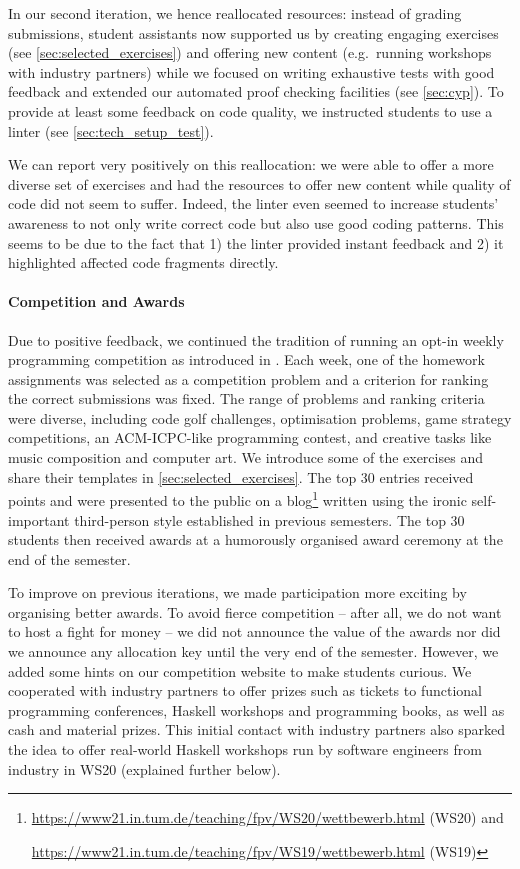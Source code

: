 In our second iteration, we hence reallocated resources:
instead of grading submissions,
student assistants now supported us by creating engaging exercises
(see \cref{sec:selected_exercises})
and offering new content (e.g.\ running workshops with industry partners)
while we focused on writing exhaustive tests with good feedback and extended our automated proof checking facilities (see \cref{sec:cyp}).
To provide at least some feedback on
code quality, we instructed students
to use a linter (see \cref{sec:tech_setup_test}).

We can report very positively on this reallocation:
we were able to offer a more diverse set of exercises and
had the resources to offer new content
while quality of code did not seem to suffer.
Indeed, the linter even seemed to increase students' awareness
to not only write correct code but also use good coding patterns.
This seems to be due to the fact that 1) the linter provided instant feedback and 2) it highlighted affected code fragments directly.

\paragraph{Competition and Awards}
Due to positive feedback,
we continued the tradition of running an opt-in weekly
programming competition as introduced in \cite{next_1100}.
Each week, one of the homework assignments
was selected as a competition problem
and a criterion for ranking the correct submissions was fixed.
The range of problems and ranking criteria were diverse,
including code golf challenges,
optimisation problems,
game strategy competitions,
an ACM-ICPC-like programming contest,
and creative tasks like music composition
and computer art.
We introduce some of the exercises and share their templates in \cref{sec:selected_exercises}.
The top 30 entries received points
and were presented to the public on a blog\footnote{\url{https://www21.in.tum.de/teaching/fpv/WS20/wettbewerb.html} (WS20) and

\url{https://www21.in.tum.de/teaching/fpv/WS19/wettbewerb.html} (WS19)}
written using the ironic self-important third-person style established in previous semesters.
The top 30 students then received awards at
a humorously organised award ceremony at the end of the semester.

To improve on previous iterations,
we made participation more exciting by organising better awards.
To avoid fierce competition -- after all, we do not want to host a fight for money --
we did not announce the value of the awards nor did we announce any allocation key
until the very end of the semester.
However, we added some hints on our competition website to make students curious.
We cooperated with industry partners
to offer prizes such as tickets to functional programming conferences,
Haskell workshops and programming books, as well as cash and material prizes.
This initial contact with industry partners
also sparked the idea to offer real-world Haskell workshops
run by software engineers from industry in WS20 (explained further below).

